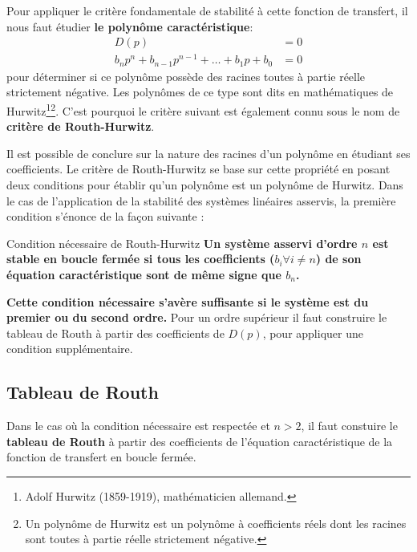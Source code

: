 Pour appliquer le critère fondamentale de stabilité à cette fonction de 
transfert, il nous faut étudier \textbf{le polynôme caractéristique}:
\begin{align}
    D(p)&=0 \nonumber\\
    b_np^n+b_{n-1}p^{n-1}+\ldots+b_1p+b_0 &= 0
\end{align}
pour déterminer si ce polynôme possède des racines toutes à partie réelle 
strictement négative. Les polynômes de ce type sont dits en mathématiques 
de Hurwitz\footnote{Adolf Hurwitz (1859-1919), 
mathématicien allemand.}\footnote{Un polynôme de Hurwitz est un polynôme à 
coefficients réels dont les racines sont toutes à partie réelle strictement 
négative.}.
C'est pourquoi le critère suivant est également connu sous le nom de 
\textbf{critère de Routh-Hurwitz}.

Il est possible de conclure sur la nature des racines d'un polynôme 
en étudiant ses coefficients. Le critère de Routh-Hurwitz se base sur 
cette propriété en posant deux conditions pour établir qu'un polynôme est 
un polynôme de Hurwitz. Dans le cas de l'application de la stabilité des 
systèmes linéaires asservis, la première condition s'énonce 
de la façon suivante :
\begin{criteria}{Condition nécessaire de Routh-Hurwitz }
    \textbf{Un système asservi d'ordre $n$ est stable en boucle fermée 
    si tous les coefficients ($b_i\forall i\neq n$) de son équation 
    caractéristique sont de même signe que $b_n$.}
\end{criteria}
\textbf{Cette condition nécessaire s'avère suffisante si le système est du 
premier ou du second ordre.} Pour un ordre supérieur il faut construire le 
tableau de Routh à partir des coefficients de $D(p)$,
pour appliquer une condition supplémentaire. 
\subsection{Tableau de Routh}
Dans le cas où la condition nécessaire est respectée et $n>2$, il faut 
constuire le \textbf{tableau de Routh} à partir des coefficients de l'équation 
caractéristique de la fonction de transfert en boucle fermée.

